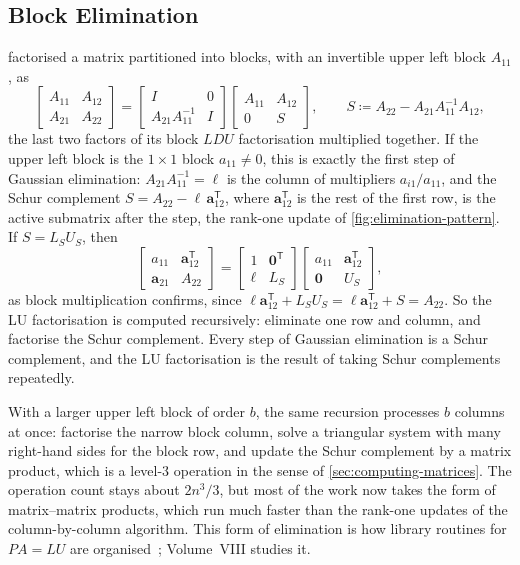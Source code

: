 \subsection{Block Elimination}

 factorised a matrix partitioned into blocks, with an invertible upper left block $A_{11}$, as
\[
\begin{bmatrix}A_{11}&A_{12}\\A_{21}&A_{22}\end{bmatrix}=\begin{bmatrix}I&0\\A_{21}A_{11}^{-1}&I\end{bmatrix}\begin{bmatrix}A_{11}&A_{12}\\0&S\end{bmatrix},\qquad S\coloneqq A_{22}-A_{21}A_{11}^{-1}A_{12},
\]
the last two factors of its block $LDU$ factorisation multiplied together. If the upper left block is the $1\times1$ block $a_{11}\ne0$, this is exactly the first step of Gaussian elimination: $A_{21}A_{11}^{-1}=\boldsymbol\ell$ is the column of multipliers $a_{i1}/a_{11}$, and the Schur complement $S=A_{22}-\boldsymbol\ell\,\mathbf a_{12}^{\mathsf T}$, where $\mathbf a_{12}^{\mathsf T}$ is the rest of the first row, is the active submatrix after the step, the rank-one update of \cref{fig:elimination-pattern}. If $S=L_SU_S$, then
\[
\begin{bmatrix}a_{11}&\mathbf a_{12}^{\mathsf T}\\\mathbf a_{21}&A_{22}\end{bmatrix}=\begin{bmatrix}1&\mathbf 0^{\mathsf T}\\\boldsymbol\ell&L_S\end{bmatrix}\begin{bmatrix}a_{11}&\mathbf a_{12}^{\mathsf T}\\\mathbf 0&U_S\end{bmatrix},
\]
as block multiplication confirms, since $\boldsymbol\ell\mathbf a_{12}^{\mathsf T}+L_SU_S=\boldsymbol\ell\mathbf a_{12}^{\mathsf T}+S=A_{22}$. So the LU factorisation is computed recursively: eliminate one row and column, and factorise the Schur complement. Every step of Gaussian elimination is a Schur complement, and the LU factorisation is the result of taking Schur complements repeatedly.

With a larger upper left block of order $b$, the same recursion processes $b$ columns at once: factorise the narrow block column, solve a triangular system with many right-hand sides for the block row, and update the Schur complement by a matrix product, which is a level-3 operation in the sense of \cref{sec:computing-matrices}. The operation count stays about $2n^3/3$, but most of the work now takes the form of matrix--matrix products, which run much faster than the rank-one updates of the column-by-column algorithm. This  form of elimination is how library routines for $PA=LU$ are organised~\cite[Sect.~3.2]{golub2013}; Volume~VIII studies it.

